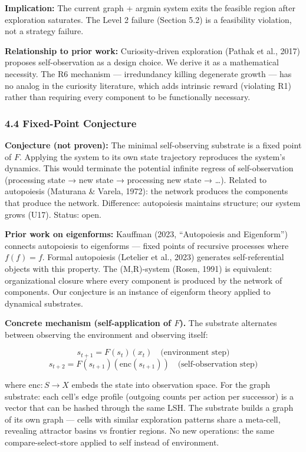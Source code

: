 \documentclass[
  11pt,
]{article}
\begin{document}
\textbf{Implication:} The current graph + argmin system exits the
feasible region after exploration saturates. The Level 2 failure
(Section 5.2) is a feasibility violation, not a strategy failure.

\textbf{Relationship to prior work:} Curiosity-driven exploration
(Pathak et al., 2017) proposes self-observation as a design choice. We
derive it as a mathematical necessity. The R6 mechanism --- irredundancy
killing degenerate growth --- has no analog in the curiosity literature,
which adds intrinsic reward (violating R1) rather than requiring every
component to be functionally necessary.

\subsubsection{4.4 Fixed-Point Conjecture}\label{fixed-point-conjecture}

\textbf{Conjecture (not proven):} The minimal self-observing substrate
is a fixed point of \(F\). Applying the system to its own state
trajectory reproduces the system's dynamics. This would terminate the
potential infinite regress of self-observation (processing state → new
state → processing new state → \ldots). Related to autopoiesis (Maturana
\& Varela, 1972): the network produces the components that produce the
network. Difference: autopoiesis maintains structure; our system grows
(U17). Status: open.

\textbf{Prior work on eigenforms:} Kauffman (2023, ``Autopoiesis and
Eigenform'') connects autopoiesis to eigenforms --- fixed points of
recursive processes where \(f(f) = f\). Formal autopoiesis (Letelier et
al., 2023) generates self-referential objects with this property. The
(M,R)-system (Rosen, 1991) is equivalent: organizational closure where
every component is produced by the network of components. Our conjecture
is an instance of eigenform theory applied to dynamical substrates.

\textbf{Concrete mechanism (self-application of \(F\)).} The substrate
alternates between observing the environment and observing itself:

\[s_{t+1} = F(s_t)(x_t) \quad \text{(environment step)}\]
\[s_{t+2} = F(s_{t+1})(\text{enc}(s_{t+1})) \quad \text{(self-observation step)}\]

where \(\text{enc}: S \to X\) embeds the state into observation space.
For the graph substrate: each cell's edge profile (outgoing counts per
action per successor) is a vector that can be hashed through the same
LSH. The substrate builds a graph of its own graph --- cells with
similar exploration patterns share a meta-cell, revealing attractor
basins vs frontier regions. No new operations: the same
compare-select-store applied to self instead of environment.
\end{document}
